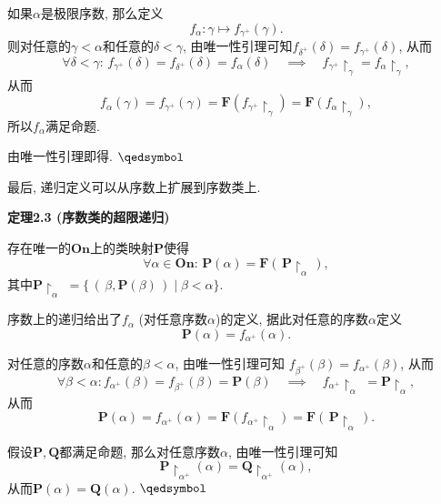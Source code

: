 \documentclass[UTF8]{ctexart}
\begin{document}
如果$\alpha$是极限序数, 那么定义
\[
    f_\alpha:\gamma\mapsto f_{\gamma^+}(\gamma).
\]
则对任意的$\gamma<\alpha$和任意的$\delta<\gamma$,
由唯一性引理可知$f_{\delta^+}(\delta)=f_{\gamma^+}(\delta)$, 从而
\[
    \forall\delta<\gamma:\,f_{\gamma^+}(\delta)=f_{\delta^+}(\delta)=
    f_\alpha(\delta)\quad\implies\quad
    f_{\gamma^+}\!\restriction_\gamma=f_\alpha\!\restriction_\gamma,
\]
从而
\[
    f_\alpha(\gamma)=f_{\gamma^+}(\gamma)=
    \mathbf{F}(f_{\gamma^+}\!\restriction_\gamma)=
    \mathbf{F}(f_\alpha\!\restriction_\gamma),
\]
所以$f_\alpha$满足命题.

 由唯一性引理即得. \hfill $\qedsymbol$





\newpage

最后, 递归定义可以从序数上扩展到序数类上.

\vspace{10pt}

\hypertarget{sec:定理2.3}{}
\noindent\textbf{定理2.3 (序数类的超限递归)}

存在唯一的$\mathbf{On}$上的类映射$\mathbf{P}$使得
\[
    \forall\alpha\in\mathbf{On}:\,
    \mathbf{P}(\alpha)=\mathbf{F}(\,\mathbf{P}\!\restriction_\alpha\,),
\]
其中$\mathbf{P}\!\restriction_\alpha\,\,=
\{\,(\,\beta,\mathbf{P}(\beta)\,)\mid\beta<\alpha\}$.



序数上的递归给出了$f_\alpha$ (对任意序数$\alpha$)的定义, 据此对任意的序数$\alpha$定义
\[
    \mathbf{P}(\alpha)=f_{\alpha^+}(\alpha).
\]

对任意的序数$\alpha$和任意的$\beta<\alpha$, 由唯一性引理可知
$f_{\beta^+}(\beta)=f_{\alpha^+}(\beta)$, 从而
\[
    \forall\beta<\alpha:f_{\alpha^+}(\beta)=f_{\beta^+}(\beta)=
    \mathbf{P}(\beta)\quad\implies\quad
    f_{\alpha^+}\!\restriction_\alpha\,\,=\mathbf{P}\!\restriction_\alpha,
\]
从而
\[
    \mathbf{P}(\alpha)=f_{\alpha^+}(\alpha)=
    \mathbf{F}(f_{\alpha^+}\!\restriction_\alpha)=
    \mathbf{F}(\,\mathbf{P}\!\restriction_\alpha\,).
\]


假设$\mathbf{P},\mathbf{Q}$都满足命题, 那么对任意序数$\alpha$,
由唯一性引理可知
\[
    \mathbf{P}\!\restriction_{\alpha^+}(\alpha)=
    \mathbf{Q}\!\restriction_{\alpha^+}(\alpha),
\]
从而$\mathbf{P}(\alpha)=\mathbf{Q}(\alpha)$. \hfill $\qedsymbol$
\end{document}
